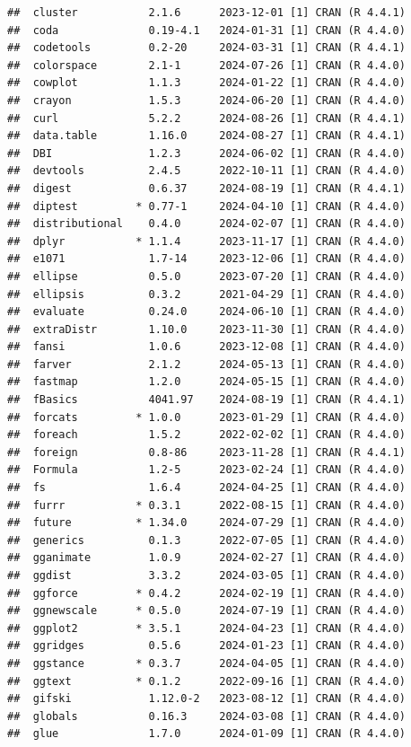 \documentclass[
  11pt,
  man,mask,floatsintext]{apa6}
\begin{document}
\begin{verbatim}
##  cluster           2.1.6      2023-12-01 [1] CRAN (R 4.4.1)
##  coda              0.19-4.1   2024-01-31 [1] CRAN (R 4.4.0)
##  codetools         0.2-20     2024-03-31 [1] CRAN (R 4.4.1)
##  colorspace        2.1-1      2024-07-26 [1] CRAN (R 4.4.0)
##  cowplot           1.1.3      2024-01-22 [1] CRAN (R 4.4.0)
##  crayon            1.5.3      2024-06-20 [1] CRAN (R 4.4.0)
##  curl              5.2.2      2024-08-26 [1] CRAN (R 4.4.1)
##  data.table        1.16.0     2024-08-27 [1] CRAN (R 4.4.1)
##  DBI               1.2.3      2024-06-02 [1] CRAN (R 4.4.0)
##  devtools          2.4.5      2022-10-11 [1] CRAN (R 4.4.0)
##  digest            0.6.37     2024-08-19 [1] CRAN (R 4.4.1)
##  diptest         * 0.77-1     2024-04-10 [1] CRAN (R 4.4.0)
##  distributional    0.4.0      2024-02-07 [1] CRAN (R 4.4.0)
##  dplyr           * 1.1.4      2023-11-17 [1] CRAN (R 4.4.0)
##  e1071             1.7-14     2023-12-06 [1] CRAN (R 4.4.0)
##  ellipse           0.5.0      2023-07-20 [1] CRAN (R 4.4.0)
##  ellipsis          0.3.2      2021-04-29 [1] CRAN (R 4.4.0)
##  evaluate          0.24.0     2024-06-10 [1] CRAN (R 4.4.0)
##  extraDistr        1.10.0     2023-11-30 [1] CRAN (R 4.4.0)
##  fansi             1.0.6      2023-12-08 [1] CRAN (R 4.4.0)
##  farver            2.1.2      2024-05-13 [1] CRAN (R 4.4.0)
##  fastmap           1.2.0      2024-05-15 [1] CRAN (R 4.4.0)
##  fBasics           4041.97    2024-08-19 [1] CRAN (R 4.4.1)
##  forcats         * 1.0.0      2023-01-29 [1] CRAN (R 4.4.0)
##  foreach           1.5.2      2022-02-02 [1] CRAN (R 4.4.0)
##  foreign           0.8-86     2023-11-28 [1] CRAN (R 4.4.1)
##  Formula           1.2-5      2023-02-24 [1] CRAN (R 4.4.0)
##  fs                1.6.4      2024-04-25 [1] CRAN (R 4.4.0)
##  furrr           * 0.3.1      2022-08-15 [1] CRAN (R 4.4.0)
##  future          * 1.34.0     2024-07-29 [1] CRAN (R 4.4.0)
##  generics          0.1.3      2022-07-05 [1] CRAN (R 4.4.0)
##  gganimate         1.0.9      2024-02-27 [1] CRAN (R 4.4.0)
##  ggdist            3.3.2      2024-03-05 [1] CRAN (R 4.4.0)
##  ggforce         * 0.4.2      2024-02-19 [1] CRAN (R 4.4.0)
##  ggnewscale      * 0.5.0      2024-07-19 [1] CRAN (R 4.4.0)
##  ggplot2         * 3.5.1      2024-04-23 [1] CRAN (R 4.4.0)
##  ggridges          0.5.6      2024-01-23 [1] CRAN (R 4.4.0)
##  ggstance        * 0.3.7      2024-04-05 [1] CRAN (R 4.4.0)
##  ggtext          * 0.1.2      2022-09-16 [1] CRAN (R 4.4.0)
##  gifski            1.12.0-2   2023-08-12 [1] CRAN (R 4.4.0)
##  globals           0.16.3     2024-03-08 [1] CRAN (R 4.4.0)
##  glue              1.7.0      2024-01-09 [1] CRAN (R 4.4.0)

\end{verbatim}
\end{document}
